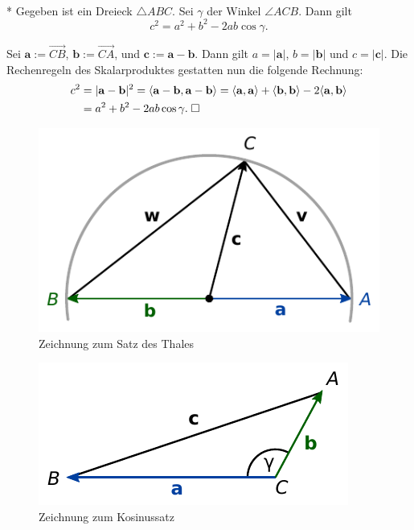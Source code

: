 \begin{Satz}[Kosinussatz]\mbox{}\\*
Gegeben ist ein Dreieck $\triangle ABC$. Sei $\gamma$ der
Winkel $\angle ACB$. Dann gilt
\[c^2=a^2+b^2-2ab\cos\gamma.\]
\end{Satz}
\begin{Beweis}
Sei $\mathbf a := \overrightarrow{CB}$,
$\mathbf b := \overrightarrow{CA}$,
und $\mathbf c := \mathbf a-\mathbf b$.
Dann gilt $a=|\mathbf a|$, $b=|\mathbf b|$ und $c=|\mathbf c|$.
Die Rechenregeln des Skalarproduktes gestatten nun die
folgende Rechnung:
\begin{align}
c^2 &= |\mathbf a-\mathbf b|^2
= \langle\mathbf a-\mathbf b,\mathbf a-\mathbf b\rangle
= \langle\mathbf a,\mathbf a\rangle
+ \langle\mathbf b,\mathbf b\rangle
- 2\langle\mathbf a,\mathbf b\rangle\\
&= a^2+b^2-2ab\cos\gamma.\;\square
\end{align}
\end{Beweis}

\begin{figure}[b!]
\centering
\includegraphics{img/Thales.pdf}
\caption{Zeichnung zum Satz des Thales}
\end{figure}

\begin{figure}[b!]
\centering
\includegraphics{img/Kosinussatz.pdf}
\caption{Zeichnung zum Kosinussatz}
\end{figure}

